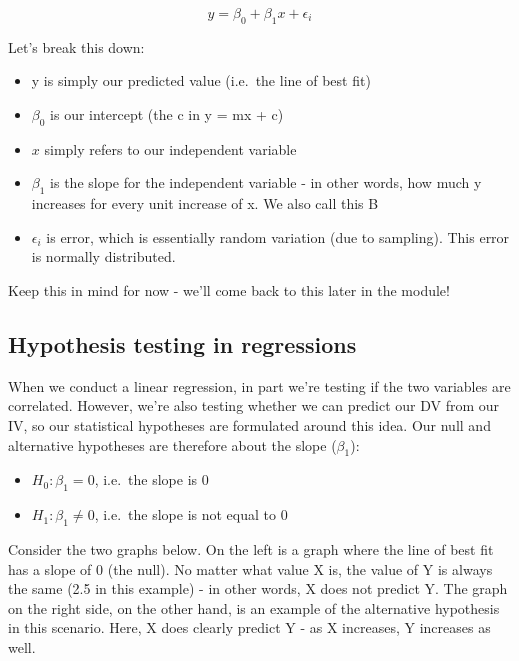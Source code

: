 \documentclass[
]{book}
\providecommand{\tightlist}{%
  \setlength{\itemsep}{0pt}\setlength{\parskip}{0pt}}
\begin{document}
\[
y = \beta_0 + \beta_1x + \epsilon_i
\]

Let's break this down:

\begin{itemize}
\tightlist
\item
  y is simply our predicted value (i.e.~the line of best fit)
\item
  \(\beta_0\) is our intercept (the c in y = mx + c)
\item
  \(x\) simply refers to our independent variable
\item
  \(\beta_1\) is the slope for the independent variable - in other words, how much y increases for every unit increase of x. We also call this B
\item
  \(\epsilon_i\) is error, which is essentially random variation (due to sampling). This error is normally distributed.
\end{itemize}

Keep this in mind for now - we'll come back to this later in the module!

\subsection{Hypothesis testing in regressions}\label{hypothesis-testing-in-regressions}

When we conduct a linear regression, in part we're testing if the two variables are correlated. However, we're also testing whether we can predict our DV from our IV, so our statistical hypotheses are formulated around this idea. Our null and alternative hypotheses are therefore about the slope (\(\beta_1\)):

\begin{itemize}
\item
  \(H_0: \beta_1 = 0\), i.e.~the slope is 0
\item
  \(H_1: \beta_1 \neq 0\), i.e.~the slope is not equal to 0
\end{itemize}

Consider the two graphs below. On the left is a graph where the line of best fit has a slope of 0 (the null). No matter what value X is, the value of Y is always the same (2.5 in this example) - in other words, X does not predict Y. The graph on the right side, on the other hand, is an example of the alternative hypothesis in this scenario. Here, X does clearly predict Y - as X increases, Y increases as well.
\end{document}
